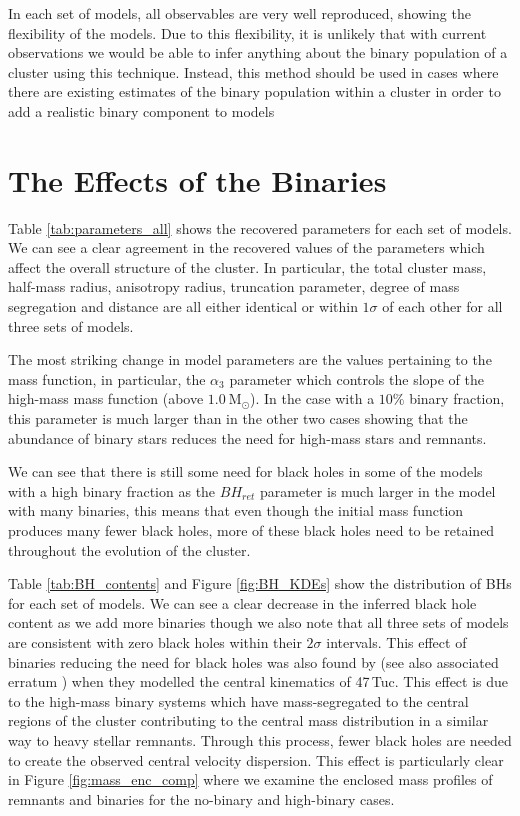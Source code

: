 In each set of models, all observables are very well reproduced, showing the flexibility of the
 models. Due to this flexibility, it is unlikely that with current observations we
would be able to infer anything about the binary population of a cluster using this technique.
Instead, this method should be used in cases where there are existing estimates of the binary
population within a cluster in order to add a realistic binary component to  models



\section{The Effects of the Binaries}


Table \ref{tab:parameters_all} shows the recovered parameters for each set of models. We can see a
clear agreement in the recovered values of the parameters which affect the overall structure of the
cluster. In particular, the total cluster mass, half-mass radius, anisotropy radius, truncation
parameter, degree of mass segregation and distance are all either identical or within $1\sigma$ of
each other for all three sets of models.



The most striking change in model parameters are the values pertaining to the mass function, in
particular, the $\alpha_3$ parameter which controls the slope of the high-mass mass function (above
$1.0 \ \mathrm{M}_\odot$). In the case with a $10\%$ binary fraction, this parameter is much larger
than in the other two cases showing that the abundance of binary stars reduces the need for high-mass
stars and remnants.

We can see that there is still some need for black holes in some of the models with a high binary fraction
as the $BH_{ret}$ parameter is much larger in the model with many binaries, this means that even
though the initial mass function produces many fewer black holes, more of these black holes need to
be retained throughout the evolution of the cluster.

Table \ref{tab:BH_contents} and Figure \ref{fig:BH_KDEs} show the distribution of BHs for each set
of models. We can see a clear decrease in the inferred black hole content as we add more binaries
though we also note that all three sets of models are consistent with zero black holes within their
$2\sigma$ intervals. This effect of binaries reducing the need for black holes was also found by
\citet{Mann2019} (see also associated erratum \citealt{Mann2020}) when they modelled the central
kinematics of 47\,Tuc. This effect is due to the high-mass binary systems which have mass-segregated
to the central regions of the cluster contributing to the central mass distribution in a similar way
to heavy stellar remnants. Through this process, fewer black holes are needed to create the observed
central velocity dispersion. This effect is particularly clear in Figure \ref{fig:mass_enc_comp}
where we examine the enclosed mass profiles of remnants and binaries for the no-binary and
high-binary cases.



